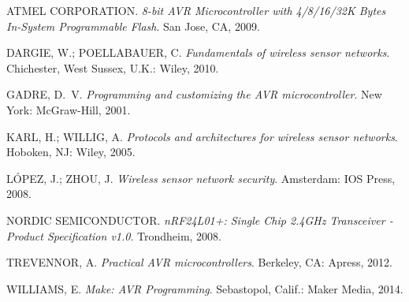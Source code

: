 {ATMEL CORPORATION. \emph{8-bit AVR Microcontroller with 4/8/16/32K Bytes
  In-System Programmable Flash}.
San Jose, CA, 2009.}

{DARGIE, W.; POELLABAUER, C. \emph{Fundamentals of wireless sensor networks}.
  Chichester, West Sussex, U.K.: Wiley, 2010.}

{GADRE, D.~V. \emph{Programming and customizing the AVR microcontroller}. New
  York: McGraw-Hill, 2001.}

{KARL, H.; WILLIG, A. \emph{Protocols and architectures for wireless sensor
  networks}. Hoboken, NJ: Wiley, 2005.}

{L\'OPEZ, J.; ZHOU, J. \emph{Wireless sensor network security}. Amsterdam: IOS
  Press, 2008.}

{NORDIC SEMICONDUCTOR. \emph{nRF24L01+: Single Chip 2.4GHz Transceiver -
  Product Specification v1.0}.
Trondheim, 2008.}

{TREVENNOR, A. \emph{Practical AVR microcontrollers}. Berkeley, CA: Apress,
  2012.}

{WILLIAMS, E. \emph{Make: AVR Programming}. Sebastopol, Calif.: Maker Media,
  2014.}

